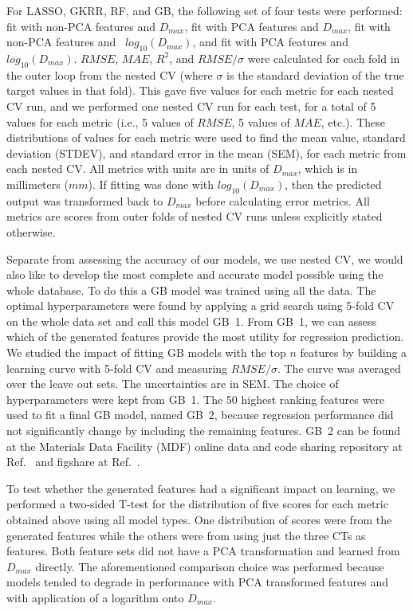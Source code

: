 \documentclass[11pt,a4paper]{article}
\begin{document}
\par
For LASSO, GKRR, RF, and GB, the following set of four tests were performed: fit with non-PCA features and $D_{max}$, fit with PCA features and $D_{max}$, fit with non-PCA features and ~$log_{10}(D_{max})$, and fit with PCA features and $log_{10}(D_{max})$. $RMSE$, $MAE$, $R^{2}$, and $RMSE/\sigma$ were calculated for each fold in the outer loop from the nested CV (where $\sigma$ is the standard deviation of the true target values in that fold). This gave five values for each metric for each nested CV run, and we performed one nested CV run for each test, for a total of 5 values for each metric (i.e., 5 values of $RMSE$, 5 values of $MAE$, etc.). These distributions of values for each metric were used to find the mean value, standard deviation (STDEV), and standard error in the mean (SEM), for each metric from each nested CV. All metrics with units are in units of $D_{max}$, which is in millimeters ($mm$). If fitting was done with $log_{10}(D_{max})$, then the predicted output was transformed back to $D_{max}$ before calculating error metrics. All metrics are scores from outer folds of nested CV runs unless explicitly stated otherwise.

\par
Separate from assessing the accuracy of our models, we use nested CV, we would also like to develop the most complete and accurate model possible using the whole database. To do this a GB model was trained using all the data. The optimal hyperparameters were found by applying a grid search using 5-fold CV on the whole data set and call this model GB~1. From GB~1, we can assess which of the generated features provide the most utility for regression prediction. We studied the impact of fitting GB models with the top $n$ features by building a learning curve with 5-fold CV and measuring $RMSE/\sigma$. The curve was averaged over the leave out sets. The uncertainties are in SEM. The choice of hyperparameters were kept from GB~1. The 50 highest ranking features were used to fit a final GB model, named GB~2, because regression performance did not significantly change by including the remaining features. GB~2 can be found at the Materials Data Facility (MDF) online data and code sharing repository at Ref.~\cite{GB_model} and figshare at Ref.~\cite{Morgan2021}.

\par
To test whether the generated features had a significant impact on learning, we performed a two-sided T-test for the distribution of five scores for each metric obtained above using all model types. One distribution of scores were from the generated features while the others were from using just the three CTs as features. Both feature sets did not have a PCA transformation and learned from $D_{max}$ directly. The aforementioned comparison choice  was performed because models tended to degrade in performance with PCA transformed features and with application of a logarithm onto $D_{max}$.
\end{document}
